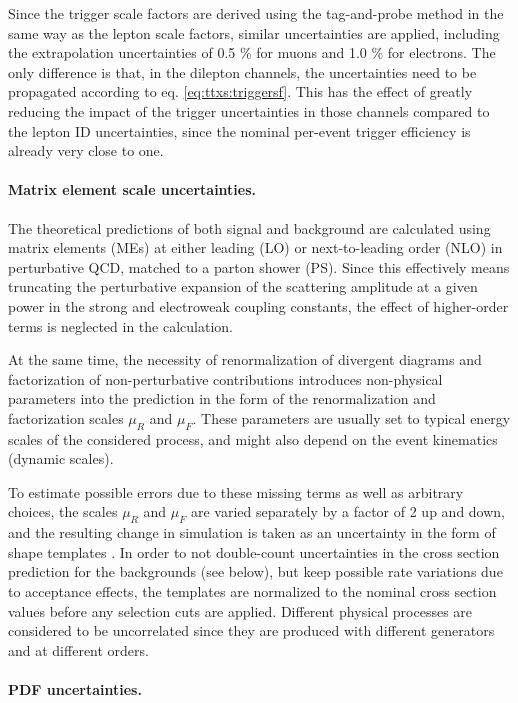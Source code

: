 Since the trigger scale factors are derived using the tag-and-probe method in the same way as the lepton scale factors, similar uncertainties are applied, including the extrapolation uncertainties of 0.5 \% for muons and 1.0 \% for electrons. The only difference is that, in the dilepton channels, the uncertainties need to be propagated according to eq. \ref{eq:ttxs:triggersf}. This has the effect of greatly reducing the impact of the trigger uncertainties in those channels compared to the lepton ID uncertainties, since the nominal per-event trigger efficiency is already very close to one.

\paragraph{Matrix element scale uncertainties.}

The theoretical predictions of both signal and background are calculated using matrix elements (MEs) at either leading (LO) or next-to-leading order (NLO) in perturbative QCD, matched to a parton shower (PS). Since this effectively means truncating the perturbative expansion of the scattering amplitude at a given power in the strong and electroweak coupling constants, the effect of higher-order terms is neglected in the calculation.

At the same time, the necessity of renormalization of divergent diagrams and factorization of non-perturbative contributions introduces non-physical parameters into the prediction in the form of the renormalization and factorization scales $\mu_R$ and $\mu_F$. These parameters are usually set to typical energy scales of the considered process, and might also depend on the event kinematics (dynamic scales).

To estimate possible errors due to these missing terms as well as arbitrary choices, the scales $\mu_R$ and $\mu_F$ are varied separately by a factor of 2 up and down, and the resulting change in simulation is taken as an uncertainty in the form of shape templates \cite{Cacciari:2004}. In order to not double-count uncertainties in the cross section prediction for the backgrounds (see below), but keep possible rate variations due to acceptance effects, the templates are normalized to the nominal cross section values before any selection cuts are applied. Different physical processes are considered to be uncorrelated since they are produced with different generators and at different orders. 

\paragraph{PDF uncertainties.}

